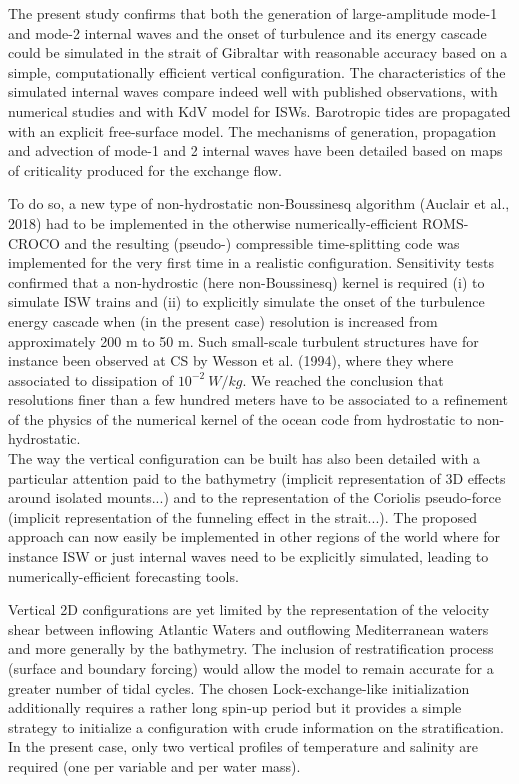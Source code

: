 \documentclass[a4paper,12pt]{article}
\begin{document}
The present study confirms that both the generation of large-amplitude mode-1 and mode-2 internal waves and the onset of turbulence and its energy cascade could be simulated in the strait of Gibraltar with reasonable accuracy based on a simple, computationally efficient vertical configuration. The characteristics of the simulated internal waves compare indeed well with published observations, with numerical studies and with KdV model for ISWs. Barotropic tides are propagated with an explicit free-surface model. The mechanisms of generation, propagation and advection of mode-1 and 2 internal waves have been detailed based on maps of criticality produced for the exchange flow.
 
 To do so, a new type of non-hydrostatic non-Boussinesq algorithm (Auclair et al., 2018) had to be implemented in the otherwise numerically-efficient ROMS-CROCO and the resulting (pseudo-) compressible time-splitting code was implemented for the very first time in a realistic configuration. Sensitivity tests confirmed that a non-hydrostic (here non-Boussinesq) kernel is required (i) to simulate ISW trains and (ii) to explicitly simulate the onset of the turbulence energy cascade when (in the present case) resolution is increased from approximately 200 m to 50 m. Such small-scale turbulent structures have for instance been observed at CS by Wesson et al. (1994), where they where associated to dissipation of $10^{-2}\ W/kg$. We reached the conclusion that resolutions finer than a few hundred meters have to be associated to a refinement of the physics of the numerical kernel of the ocean code from hydrostatic to non-hydrostatic.\\
 The way the vertical configuration can be built has also been detailed with a particular attention paid to the bathymetry (implicit representation of 3D effects around isolated mounts...) and to the representation of the Coriolis pseudo-force (implicit representation of the funneling effect in the strait...). The proposed approach can now easily be implemented in other regions of the world where for instance ISW or just internal waves need to be explicitly simulated, leading to numerically-efficient forecasting tools.
 
 Vertical 2D configurations are yet limited by the representation of the velocity shear between inflowing Atlantic Waters and outflowing Mediterranean waters and more generally by the bathymetry. The inclusion of restratification process (surface and boundary forcing) would allow the model to remain accurate for a greater number of tidal cycles. The chosen Lock-exchange-like initialization additionally requires a rather long spin-up period but it provides a simple strategy to initialize a configuration with crude information on the stratification. In the present case, only two vertical profiles of temperature and salinity are required (one per variable and per water mass).
 
\end{document}
